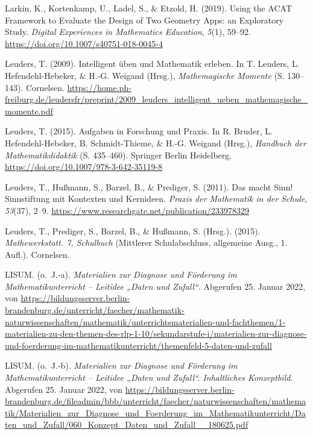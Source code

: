 \documentclass[
]{scrbook}
\newlength{\cslhangindent}
\newlength{\cslentryspacingunit} %
\newenvironment{CSLReferences}[2] %
 {%
  \setlength{\parindent}{0pt}
  \ifodd #1
  \let\oldpar\par
  \def\par{\hangindent=\cslhangindent\oldpar}
  \fi
  \setlength{\parskip}{#2\cslentryspacingunit}
 }%
 {}
\theoremstyle{definition}
\theoremstyle{definition}
\theoremstyle{definition}
\theoremstyle{definition}
\theoremstyle{remark}
\begin{document}
\begin{CSLReferences}{1}{0}
\leavevmode{}%
Larkin, K., Kortenkamp, U., Ladel, S., \& Etzold, H. (2019). Using the {ACAT} {Framework} to {Evaluate} the {Design} of {Two} {Geometry} {Apps}: an {Exploratory} {Study}. \emph{Digital Experiences in Mathematics Education}, \emph{5}(1), 59--92. \url{https://doi.org/10.1007/s40751-018-0045-4}

\leavevmode{}%
Leuders, T. (2009). Intelligent üben und {Mathematik} erleben. In T. Leuders, L. Hefendehl-Hebeker, \& H.-G. Weigand (Hrsg.), \emph{Mathemagische {Momente}} (S. 130--143). Cornelsen. \url{https://home.ph-freiburg.de/leudersfr/preprint/2009_leuders_intelligent_ueben_mathemagische_momente.pdf}

\leavevmode{}%
Leuders, T. (2015). Aufgaben in {Forschung} und {Praxis}. In R. Bruder, L. Hefendehl-Hebeker, B. Schmidt-Thieme, \& H.-G. Weigand (Hrsg.), \emph{Handbuch der {Mathematikdidaktik}} (S. 435--460). Springer Berlin Heidelberg. \url{https://doi.org/10.1007/978-3-642-35119-8}

\leavevmode{}%
Leuders, T., Hußmann, S., Barzel, B., \& Prediger, S. (2011). Das macht {Sinn}! {Sinnstiftung} mit {Kontexten} und {Kernideen}. \emph{Praxis der Mathematik in der Schule}, \emph{53}(37), 2--9. \url{https://www.researchgate.net/publication/233978329}

\leavevmode{}%
Leuders, T., Prediger, S., Barzel, B., \& Hußmann, S. (Hrsg.). (2015). \emph{Mathewerkstatt. 7, {Schulbuch}} (Mittlerer Schulabschluss, allgemeine Ausg., 1. Aufl.). Cornelsen.

\leavevmode{}%
LISUM. (o.~J.-a). \emph{Materialien zur {Diagnose} und {Förderung} im {Mathematikunterricht} -- {Leitidee} „{Daten} und {Zufall}``}. Abgerufen 25. Januar 2022, von \url{https://bildungsserver.berlin-brandenburg.de/unterricht/faecher/mathematik-naturwissenschaften/mathematik/unterrichtsmaterialien-und-fachthemen/1-materialien-zu-den-themen-des-rlp-1-10/sekundarstufe-i/materialien-zur-diagnose-und-foerderung-im-mathematikunterricht/themenfeld-5-daten-und-zufall}

\leavevmode{}%
LISUM. (o.~J.-b). \emph{Materialien zur {Diagnose} und {Förderung} im {Mathematikunterricht} -- {Leitidee} „{Daten} und {Zufall}``. {Inhaltliches} {Konzeptbild}}. Abgerufen 25. Januar 2022, von \url{https://bildungsserver.berlin-brandenburg.de/fileadmin/bbb/unterricht/faecher/naturwissenschaften/mathematik/Materialien_zur_Diagnose_und_Foerderung_im_Mathematikunterricht/Daten_und_Zufall/060_Konzept_Daten_und_Zufall__180625.pdf}


\end{CSLReferences}
\end{document}
